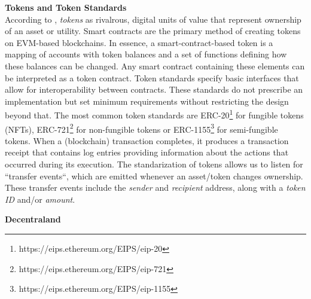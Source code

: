 \documentclass[12pt,a4paper,titlepage,oneside,english]{article}
\begin{document}
\textbf{Tokens and Token Standards}\\
According to \cite{roth2019tokenization}, \textit{tokens} as rivalrous, digital units of value that represent ownership of an asset or utility. Smart contracts are the primary method of creating tokens on EVM-based blockchains. In essence, a smart-contract-based token is a mapping of accounts with token balances and a set of functions defining how these balances can be changed. Any smart contract containing these elements can be interpreted as a token contract. \citep{roth2019tokenization} \newline
Token standards specify basic interfaces that allow for interoperability between contracts. These standards do not prescribe an implementation but set minimum requirements without restricting the design beyond that. 
The most common token standards are ERC-20\footnote{https://eips.ethereum.org/EIPS/eip-20} for fungible tokens (NFTs), ERC-721\footnote{https://eips.ethereum.org/EIPS/eip-721} for non-fungible tokens or ERC-1155\footnote{https://eips.ethereum.org/EIPS/eip-1155} for semi-fungible tokens.\newline
When a (blockchain) transaction completes, it produces a transaction receipt that contains log entries providing information about the actions that occurred during its execution. The standarization of tokens allows us to listen for ``transfer events``, which are emitted whenever an asset/token changes ownership.\cite{mastering_ethereum}
These transfer events include the \textit{sender} and \textit{recipient} address, along with a \textit{token ID} and/or \textit{amount}. 




\textbf{Decentraland} \\
\end{document}
